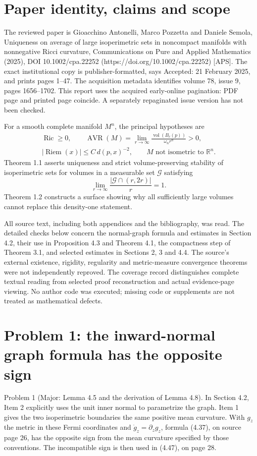 \documentclass[10pt]{article}
\begin{document}
\section*{Paper identity, claims and scope}
The reviewed paper is Gioacchino Antonelli, Marco Pozzetta and Daniele Semola, Uniqueness on average of large isoperimetric sets in noncompact manifolds with nonnegative Ricci curvature, Communications on Pure and Applied Mathematics (2025), DOI 10.1002/cpa.22252 (https://doi.org/10.1002/cpa.22252) [APS]. The exact institutional copy is publisher-formatted, says Accepted: 21 February 2025, and prints pages 1–47. The acquisition metadata identifies volume 78, issue 9, pages 1656–1702. This report uses the acquired early-online pagination: PDF page and printed page coincide. A separately repaginated issue version has not been checked.\par
For a smooth complete manifold \(M^n\), the principal hypotheses are \[\begin{gathered}
 \operatorname{Ric}\geq0,\qquad
 \operatorname{AVR}(M)=
 \lim_{r\to\infty}\frac{\operatorname{vol}(B_r(p))}{\omega_n r^n}>0,\\
 |\operatorname{Riem}(x)|\leq C\,d(p,x)^{-2},
 \qquad M\text{ not isometric to }\mathbb R^n .
 \end{gathered}\] Theorem 1.1 asserts uniqueness and strict volume-preserving stability of isoperimetric sets for volumes in a measurable set \(\mathcal G\) satisfying \[\lim_{r\to\infty}\frac{|\mathcal G\cap(r,2r)|}{r}=1 .\] Theorem 1.2 constructs a surface showing why all sufficiently large volumes cannot replace this density-one statement.\par
All source text, including both appendices and the bibliography, was read. The detailed checks below concern the normal-graph formula and estimates in Section 4.2, their use in Proposition 4.3 and Theorem 4.1, the compactness step of Theorem 3.1, and selected estimates in Sections 2, 3 and 4.4. The source’s external existence, rigidity, regularity and metric-measure convergence theorems were not independently reproved. The coverage record distinguishes complete textual reading from selected proof reconstruction and actual evidence-page viewing. No author code was executed; missing code or supplements are not treated as mathematical defects.\par
\section*{Problem 1: the inward-normal graph formula has the opposite sign}
Problem 1 (Major: Lemma 4.5 and the derivation of Lemma 4.8).  In Section 4.2, Item 2 explicitly uses the unit inner normal to parametrize the graph. Item 1 gives the two isoperimetric boundaries the same positive mean curvature. With \(g_z\) the metric in these Fermi coordinates and \(\dot g_z=\partial_z g_z\), formula (4.37), on source page 26, has the opposite sign from the mean curvature specified by those conventions. The incompatible sign is then used in (4.47), on page 28.\par
\end{document}
